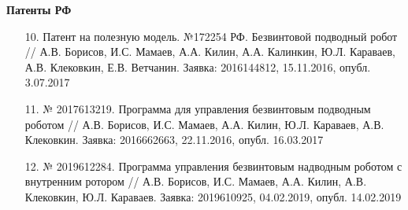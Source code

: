 \hspace{-11mm}
\textbf{Патенты РФ}

{

	\begin{enumerate}
		
		\item[10.] Патент на полезную модель. №172254 РФ. Безвинтовой подводный робот //  А.В. Борисов, И.С. Мамаев, А.А. Килин, А.А. Калинкин, Ю.Л. Караваев, А.В. Клековкин, Е.В. Ветчанин. Заявка: 2016144812, 15.11.2016, опубл. 3.07.2017
		
		\item[11.] № 2017613219. Программа для управления безвинтовым подводным роботом // А.В. Борисов, И.С. Мамаев, А.А. Килин, Ю.Л. Караваев, А.В. Клековкин. Заявка: 2016662663, 22.11.2016, опубл. 16.03.2017
		
		\item[12.] № 2019612284. Программа управления безвинтовым надводным роботом с внутренним ротором // А.В. Борисов, И.С. Мамаев, А.А. Килин, А.В. Клековкин, Ю.Л. Караваев. Заявка: 2019610925, 04.02.2019, опубл. 14.02.2019
	\end{enumerate}
}
	
